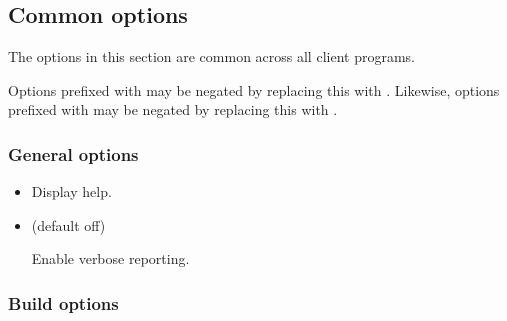 \subsection{Common options\label{Common_options}}

The options in this section are common across all client programs.

Options prefixed with  may be negated by replacing this with
. Likewise, options prefixed with  may be negated
by replacing this with .

\subsubsection{General options}

\begin{itemize}
\item {}

Display help.

\item {} (default off)

Enable verbose reporting.
\end{itemize}

\subsubsection{Build options}

